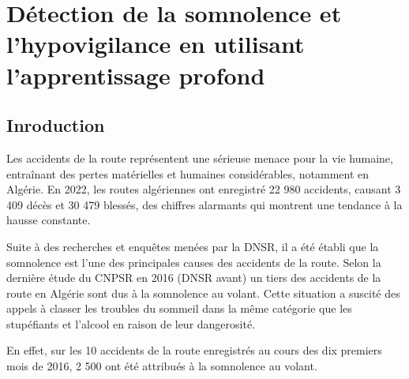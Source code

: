 \chapter{Détection de la somnolence et l'hypovigilance en utilisant l'apprentissage profond}



\section{Inroduction}
Les accidents de la route représentent une sérieuse menace pour la vie humaine, entraînant des pertes matérielles et humaines considérables, notamment en Algérie.
En 2022, les routes algériennes ont enregistré 22 980 accidents, causant 3 409 décès et 30 479 blessés\cite{AtlasMagasine2}, des chiffres alarmants qui montrent une tendance à la hausse constante.

Suite à des recherches et enquêtes menées par la DNSR, il a été établi que la somnolence est l'une des principales causes des accidents de la route. Selon la dernière étude du CNPSR en 2016 (DNSR avant) un tiers des accidents de la route en Algérie sont dus à la somnolence au volant. Cette situation a suscité des appels à classer les troubles du sommeil dans la même catégorie que les stupéfiants et l'alcool en raison de leur dangerosité\cite{autobip}.

En effet, sur les 10 accidents de la route enregistrés au cours des dix premiers mois de 2016, 2 500 ont été attribués à la somnolence au volant\cite{autobip}.

